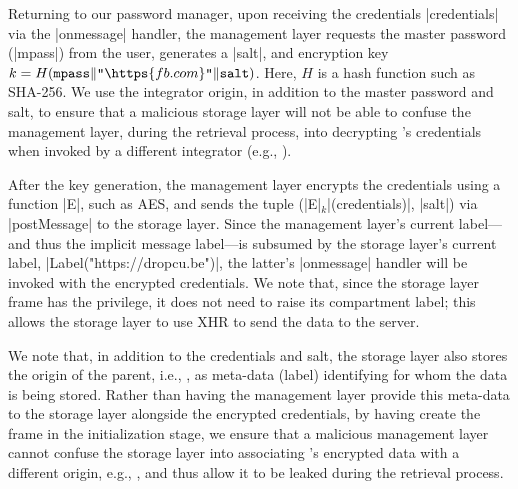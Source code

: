 Returning to our password manager, upon receiving the credentials
\js|credentials| via the \js|onmessage| handler, the management
layer requests the master password (\js|mpass|) from the user, 
generates a \js|salt|, and encryption key $k =
H(\texttt{mpass}\|\texttt{"}\https{fb.com}\texttt{"}\|\texttt{salt})$.
%
Here, $H$ is a hash function such as SHA-256.
%
We use the integrator origin, in addition to the master password and
salt, to ensure that a malicious storage layer will not be able to
confuse the management layer, during the retrieval process, into
decrypting 's credentials when invoked by a different
integrator (e.g., ).

% 
After the key generation, the management layer encrypts the
credentials using a function \js|E|, such as AES, and sends the tuple
(\js|E|$_k$\js|(credentials)|, \js|salt|) via \js|postMessage| to
the storage layer.
%
Since the management layer's current label---and thus the implicit
message label---is subsumed by the storage layer's current label,
\js|Label("https://dropcu.be")|, the latter's \js|onmessage| handler
will be invoked with the encrypted credentials.
%
We note that, since the storage layer frame has the 
privilege, it does not need to raise its compartment label; this
allows the storage layer to use XHR to send the data to the
 server.
 
We note that, in addition to the credentials and salt, the storage
layer also stores the origin of the parent, i.e., , as
meta-data (label) identifying for whom the data is being stored.
%
Rather than having the management layer provide this meta-data to the
storage layer alongside the encrypted credentials, by having
 create the frame in the initialization stage, we ensure
that a malicious management layer cannot confuse the storage layer
into associating 's encrypted data with a different
origin, e.g., , and thus allow it to be leaked during
the retrieval process.

